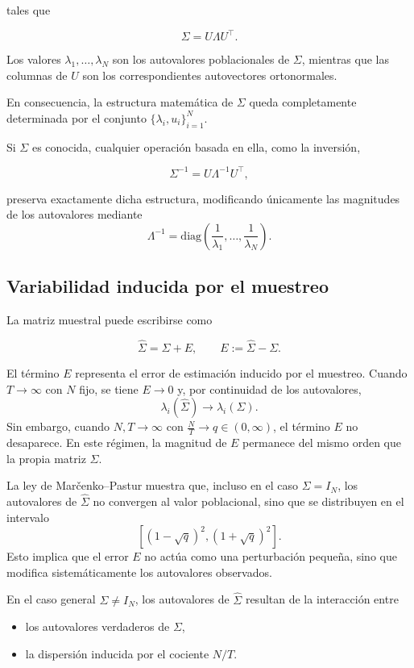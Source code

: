 \documentclass[letterpaper,12pt,oneside]{book}
\begin{document}
tales que

\[
\Sigma = U \Lambda U^\top.
\]

Los valores $\lambda_1,\dots,\lambda_N$ son los autovalores poblacionales de $\Sigma$, mientras que las columnas de $U$
son los correspondientes autovectores ortonormales.

En consecuencia, la estructura matemática de $\Sigma$ queda completamente determinada por el conjunto
$\{\lambda_i, u_i\}_{i=1}^N$.

Si $\Sigma$ es conocida, cualquier operación basada en ella, como la inversión,

\[
\Sigma^{-1} = U \Lambda^{-1} U^\top,
\]

preserva exactamente dicha estructura, modificando únicamente las magnitudes de los autovalores mediante
\[
\Lambda^{-1} = \mathrm{diag}\left(\frac{1}{\lambda_1},\dots,\frac{1}{\lambda_N}\right).
\]

\subsection*{Variabilidad inducida por el muestreo}

La matriz muestral puede escribirse como

\[
\widehat{\Sigma}
=
\Sigma
+
E,
\qquad
E := \widehat{\Sigma} - \Sigma.
\]

El término $E$ representa el error de estimación inducido por el muestreo.
Cuando $T \to \infty$ con $N$ fijo, se tiene $E \to 0$ y, por continuidad de los autovalores,
\[
\lambda_i(\widehat{\Sigma}) \to \lambda_i(\Sigma).
\]
Sin embargo, cuando $N,T \to \infty$ con $\frac{N}{T} \to q \in (0,\infty)$, el término $E$ no desaparece. En este régimen, la magnitud de $E$ permanece del mismo orden que la propia matriz $\Sigma$.

La ley de Marčenko--Pastur muestra que, incluso en el caso $\Sigma = I_N$, los autovalores de $\widehat{\Sigma}$ no convergen al valor poblacional, sino que se distribuyen en el intervalo
\[
[(1-\sqrt{q})^2,(1+\sqrt{q})^2].
\]
Esto implica que el error $E$ no actúa como una perturbación pequeña, sino que modifica sistemáticamente los autovalores observados.

En el caso general $\Sigma \neq I_N$, los autovalores de $\widehat{\Sigma}$ resultan de la interacción entre

\begin{itemize}
    \item los autovalores verdaderos de $\Sigma$,
    \item la dispersión inducida por el cociente $N/T$.
\end{itemize}
\end{document}
